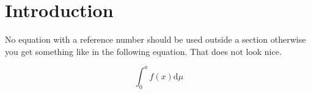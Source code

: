 \chapter{Introduction}

No equation with a reference number should be used outside a section
otherwise you get something like in the following equation.  That does
not look nice.

\begin{equation}
\int_0^a f(x) \text{d}\mu
\end{equation}

\vfill

